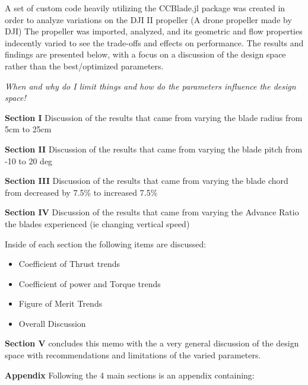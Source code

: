 \documentclass[12pt]{texmemo} %
\begin{document}
\maketitle

\highlight

A set of custom code heavily utilizing the CCBlade.jl package was created in order to analyze variations on the DJI II propeller (A drone propeller made by DJI) The propeller was imported, analyzed, and its geometric and flow properties indecently varied to see the trade-offs and effects on performance. The results and findings are presented below, with a focus on a discussion of the design space rather than the best/optimized parameters.

\textit{When and why do I limit things and how do the parameters influence the design space!}

\textbf{Section I} Discussion of the results that came from varying the blade radius from 5cm to 25cm

\textbf{Section II} Discussion of the results that came from varying the blade pitch from -10 to 20 deg

\textbf{Section III} Discussion of the results that came from varying the blade chord from decreased by 7.5\% to increased 7.5\%

\textbf{Section IV} Discussion of the results that came from varying the Advance Ratio the blades experienced (ie changing vertical speed)

Inside of each section the following items are discussed:

\setlength{\parskip}{0pt} %

\begin{itemize}
    \item Coefficient of Thrust trends
    \item Coefficient of power and Torque trends
    \item Figure of Merit Trends
    \item Overall Discussion
\end{itemize}

\setlength{\parskip}{0.5\baselineskip plus 2pt} %

\textbf{Section V} concludes this memo with the a very general discussion of the design space with recommendations and limitations of the varied parameters.

\textbf{Appendix} Following the 4 main sections is an appendix containing:

\setlength{\parskip}{0pt} %
\end{document}
